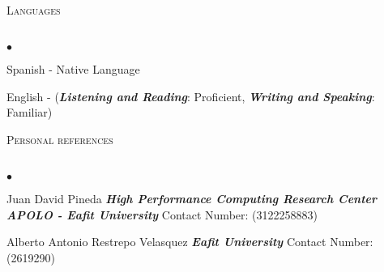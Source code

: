 \documentclass[a4paper]{article}
\newcommand{\lineunder}{\vspace*{-8pt} \\ \hspace*{-18pt} \hrulefill \\}
\newcommand{\header}[1]{{\hspace*{-15pt}\vspace*{6pt}
\textsc{#1}} \vspace*{-6pt} \lineunder}
\newenvironment{achievements}{\begin{list}{$\bullet$}{\topsep 0pt \itemsep
-2pt}}{\vspace*{4pt}\end{list}}
\newcommand{\emphasys}[1]{\textbf{\emph{#1}}}
\begin{document}
\header{Languages}
\begin{achievements}
\item{Spanish - Native Language}
\item{English - (\emphasys{Listening and Reading}: Proficient, \emphasys{Writing and Speaking}: Familiar)}
\end{achievements}

\header{Personal references}
\begin{achievements}
\item{Juan David Pineda \emphasys{High Performance Computing Research Center APOLO - Eafit University} Contact Number: (3122258883)}
\item{Alberto Antonio Restrepo Velasquez  \emphasys{Eafit University} Contact Number: (2619290)}
\end{achievements}
\end{document}
